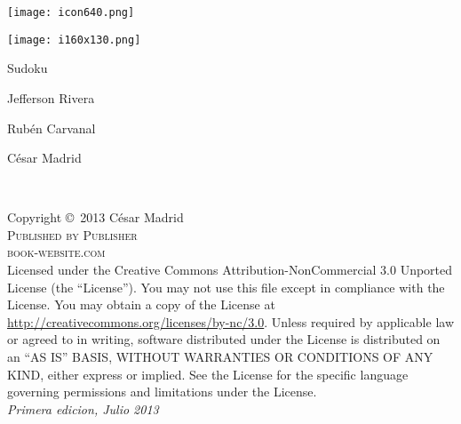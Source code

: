 \documentclass[11pt,fleqn]{book} %
\begin{document}

\begingroup
\thispagestyle{empty}
\centering
\vspace*{9cm}
\par\normalfont\fontsize{35}{35}\sffamily\selectfont
\centering\texttt{[image: icon640.png]}

\centering\texttt{[image: i160x130.png]}

Sudoku\par %
\vspace*{1cm}
{\Huge Jefferson Rivera}\par %
{\Huge Rubén Carvanal}\par %
{\Huge César Madrid}\par %
\endgroup


\newpage
~\vfill
\thispagestyle{empty}

\noindent Copyright \copyright\ 2013 César Madrid\\ %

\noindent \textsc{Published by Publisher}\\ %

\noindent \textsc{book-website.com}\\ %

\noindent Licensed under the Creative Commons Attribution-NonCommercial 3.0 Unported License (the ``License''). You may not use this file except in compliance with the License. You may obtain a copy of the License at \url{http://creativecommons.org/licenses/by-nc/3.0}. Unless required by applicable law or agreed to in writing, software distributed under the License is distributed on an \textsc{``AS IS'' BASIS, WITHOUT WARRANTIES OR CONDITIONS OF ANY KIND}, either express or implied. See the License for the specific language governing permissions and limitations under the License.\\ %

\noindent \textit{Primera edicion, Julio 2013} %
\end{document}

